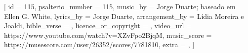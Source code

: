
[
    id                     = {115},
    psalterio_number       = {115},
    music_by               = {Jorge Duarte; baseado em Ellen G. White},
    lyrics_by              = {Jorge Duarte},
    arrangement_by         = {Lídia Moreira e Joaldi},
    bible_verse            = {},
    licence_or_copyright   = {},
    video_url              = {https://www.youtube.com/watch?v=XZvFpo2BjqM},
    music_score            = {https://musescore.com/user/26352/scores/7781810},
    extra                  = {},
]


\beginverse

